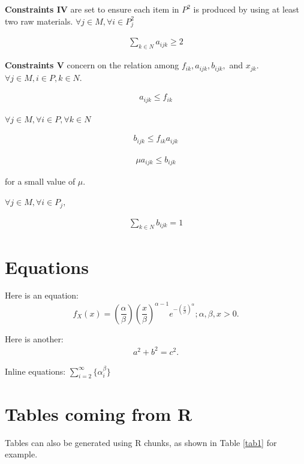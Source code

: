 \documentclass[preprint, 3p,
authoryear]{elsarticle} %
\begin{document}
\textbf{Constraints IV} are set to ensure each item in \(P^2\) is
produced by using at least two raw materials.
\(\forall j \in M, \forall i \in P^2_j\)

\begin{align}
  \sum_{k \in N} a_{ijk} \geq 2
\end{align}

\textbf{Constraints V} concern on the relation among
\(f_{ik}, a_{ijk}, b_{ijk},\) and \(x_{jk}\).
\(\forall j \in M, i \in P, k \in N\).

\begin{align}
  a_{ijk} \leq f_{ik}
\end{align}

\(\forall j \in M, \forall i \in P, \forall k \in N\)

\begin{align}
  b_{ijk} \leq f_{ik} a_{ijk}
\end{align}

\begin{align}
  \mu a_{ijk} \leq b_{ijk}
\end{align}

for a small value of \(\mu\).

\(\forall j \in \hat{M}, \forall i \in P_j,\)

\begin{align}
  \sum_{k \in N} b_{ijk} = 1
\end{align}

\hypertarget{equations}{%
\section{Equations}\label{equations}}

Here is an equation: \[ 
  f_{X}(x) = \left(\frac{\alpha}{\beta}\right)
  \left(\frac{x}{\beta}\right)^{\alpha-1}
  e^{-\left(\frac{x}{\beta}\right)^{\alpha}}; 
  \alpha,\beta,x > 0 .
\]

Here is another: \begin{align}
  a^2+b^2=c^2.
\end{align}

Inline equations: \(\sum_{i = 2}^\infty\{\alpha_i^\beta\}\)

\hypertarget{tables-coming-from-r}{%
\section{Tables coming from R}\label{tables-coming-from-r}}

Tables can also be generated using R chunks, as shown in Table
\ref{tab1} for example.
\end{document}
